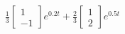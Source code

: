 \documentclass[preview]{standalone}
\begin{document}
\begin{align*}
\frac{1}{3} \begin{bmatrix} 1 \\ -1 \end{bmatrix} e^{0.2t} + \frac{2}{3} \begin{bmatrix} 1 \\ 2 \end{bmatrix} e^{0.5t}
\end{align*}
\end{document}
